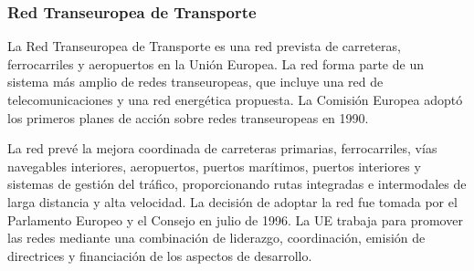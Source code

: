 \subsubsection{Red Transeuropea de Transporte}

La Red Transeuropea de Transporte es una red prevista de carreteras, ferrocarriles y aeropuertos en la Unión Europea. La red forma parte de un sistema más amplio de redes transeuropeas, que incluye una red de telecomunicaciones y una red energética propuesta. La Comisión Europea adoptó los primeros planes de acción sobre redes transeuropeas en 1990.

La red prevé la mejora coordinada de carreteras primarias, ferrocarriles, vías navegables interiores, aeropuertos, puertos marítimos, puertos interiores y sistemas de gestión del tráfico, proporcionando rutas integradas e intermodales de larga distancia y alta velocidad. La decisión de adoptar la red fue tomada por el Parlamento Europeo y el Consejo en julio de 1996. La UE trabaja para promover las redes mediante una combinación de liderazgo, coordinación, emisión de directrices y financiación de los aspectos de desarrollo.


